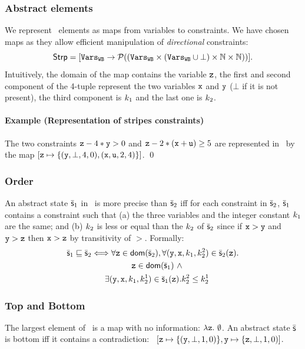 \documentclass[10pt]{sigplanconf}
\begin{document}
\subsubsection*{Abstract elements} 
We represent \Stripes\ elements as maps from variables to constraints.
We have chosen maps as they allow efficient manipulation of \emph{directional} constraints:
\[
\mathsf{Strp} = [\mathtt{Vars}_{\mathtt{WB}} \rightarrow\mathcal{P}{((\mathtt{Vars}_{\mathtt{WB}} \times (\mathtt{Vars}_{\mathtt{WB}} \cup \bot) \times \mathbb{N} \times \mathbb{N}))}].
\]
Intuitively, the domain of the map contains the variable $\mathtt{z}$, the first and second component of the 4-tuple represent the two variables $\mathtt{x}$ and $\mathtt{y}$ ($\bot$ if it is not present), the third component is $k_1$ and the last one is $k_2$.\\

\paragraph{Example (Representation of stripes constraints)}
The two  constraints
$\mathtt{z} - 4*\mathtt{y} > 0$ and $\mathtt{z} - 2*(\mathtt{x}+\mathtt{u}) \geq 5$ 
are represented in \Stripes\ by the map
$ [\mathtt{z} \mapsto \{ (\mathtt{y}, \bot, 4, 0), (\mathtt{x}, \mathtt{u}, 2, 4)\}] $. \qed


\subsubsection*{Order}
An abstract state $\bar{\mathsf{s}}_1$ in \Stripes\ is more precise than  $\bar{\mathsf{s}}_2$ iff for each constraint in $\bar{\mathsf{s}}_2$, $\bar{\mathsf{s}}_1$ contains a constraint such that
(a) the three variables and the integer constant $k_1$ are the same;
and (b) $k_2$ is less or equal than the $k_2$ of $\bar{\mathsf{s}}_2$ since if $\mathtt{x} > \mathtt{y}$ and $\mathtt{y} > \mathtt{z}$ then $\mathtt{x} > \mathtt{z}$ by transitivity of $>$.
Formally:
\begin{multline*}
\bar{\mathsf{s}}_1 \sqsubseteq \bar{\mathsf{s}}_2 \Longleftrightarrow  \forall \mathtt{z} \in \mathsf{dom}(\bar{\mathsf{s}}_2), \forall (\mathtt{y}, \mathtt{x}, k_1, k^2_2) \in \bar{\mathsf{s}}_2(\mathtt{z}).  \\
 \quad   \mathtt{z} \in \mathsf{dom}(\bar{\mathsf{s}}_1)\ \land \\
 \quad  \exists (\mathtt{y}, \mathtt{x}, k_1, k^1_2) \in \bar{\mathsf{s}}_1(\mathtt{z}). k^2_2 \leq k^1_2
\end{multline*}


\subsubsection*{Top and Bottom}
The largest element of \Stripes\ is a map with no information: $\lambda \mathtt{z}.\ \emptyset$.
An abstract state $\bar{\mathsf{s}}$ is bottom iff it contains a contradiction: \eg\ $[\mathtt{z} \mapsto \{ (\mathtt{y}, \bot, 1, 0)\}, \mathtt{y} \mapsto \{ \mathtt{z}, \bot, 1, 0)]$.
\end{document}
